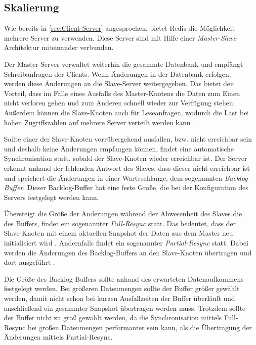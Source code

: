 
\subsection{Skalierung}
\label{sec:Skalierung}
Wie bereits in \autoref{sec:Client-Server} angesprochen, bietet Redis die Möglichkeit mehrere Server zu verwenden.
Diese Server sind mit Hilfe einer \textit{Master-Slave}-Architektur miteinander verbunden.

Der Master-Server verwaltet weiterhin die gesammte Datenbank und empfängt Schreibanfragen der Clients.
Wenn Änderungen in der Datenbank erfolgen, werden diese Änderungen an die Slave-Server weitergegeben.
Das bietet den Vorteil, dass im Falle eines Ausfalls des Master-Knotens die Daten zum Einen nicht verloren gehen und zum Anderen schnell wieder zur Verfügung stehen.
Außerdem können die Slave-Knoten auch für Leseanfragen, wodurch die Last bei hohen Zugriffszahlen auf mehrere Server verteilt werden kann \cite[141]{3}.

Sollte einer der Slave-Knoten vorrübergehend ausfallen, bzw. nicht erreichbar sein und deshalb keine Änderungen empfangen können, findet eine automatische Synchronisation statt, sobald der Slave-Knoten wieder erreichbar ist.
Der Server erkennt anhand der fehlenden Antwort des Slaves, dass dieser nicht erreichbar ist und speichert die Änderungen in einer Warteschlange, dem sogenannten \textit{Backlog-Buffer}. 
Dieser Backlog-Buffer hat eine feste Größe, die bei der Konfiguration des Servers festgelegt werden kann. 

Übersteigt die Größe der Änderungen während der Abwesenheit des Slaves die des Buffers, findet ein sogenannter \textit{Full-Resync} statt.
Das bedeutet, dass der Slave-Knoten mit einem aktuellen Snapshot der Daten aus dem Master neu initialisiert wird \cite{Redis-Docs-Replication}.
Andernfalls findet ein sogenannter \textit{Partial-Resync} statt. Dabei werden die Änderungen des Backlog-Buffers an den Slave-Knoten übertragen und dort ausgeführt \cite[146 - 153]{3}.

Die Größe des Backlog-Buffers sollte anhand des erwarteten Datenaufkommens festgelegt werden. 
Bei größeren Datenmengen sollte der Buffer größer gewählt werden, damit nicht schon bei kurzen Ausfallzeiten der Buffer überläuft und anschließend ein gesammter Snapshot übertragen werden muss.
Trotzdem sollte der Buffer nicht zu groß gewählt werden, da die Synchronisation mittels Full-Resync bei großen Datenmengen performanter sein kann, als die Übertragung der Änderungen mittels Partial-Resync.

